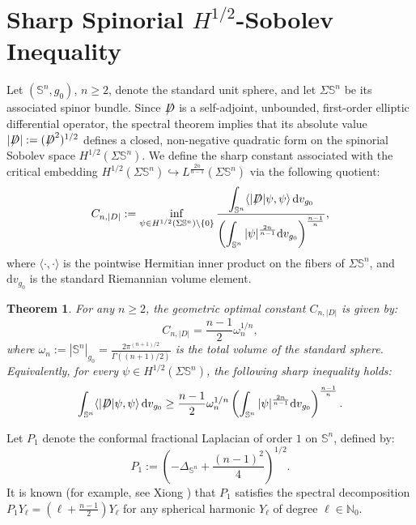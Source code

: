 \documentclass[a4paper, 12pt]{article}
\newtheorem{theorem}{Theorem}[section]
\def\slashiii#1{\setbox0=\hbox{$#1$}#1\hskip-\wd0\hbox to\wd0{\hss\sl/\/\hss}}
\begin{document}

\appendix
\makeatletter
\renewcommand{\@seccntformat}[1]{\ifcsname quad#1\endcsname\csname quad#1\endcsname\else\csname the#1\endcsname\quad\fi}
\renewcommand{\thesection}{Appendix \Alph{section}}
\makeatother
\renewcommand{\thetheorem}{\Alph{section}.\arabic{theorem}}
\newpage

\section{Sharp Spinorial $H^{1/2}$-Sobolev Inequality} 
Let $(\mathbb{S}^n, g_0)$, $n \ge 2$, denote the standard unit sphere, and let $\Sigma \mathbb{S}^n$ be its associated spinor bundle. Since $\slashiii{D}$ is a self-adjoint, unbounded, first-order elliptic differential operator, the spectral theorem implies that its absolute value $|\slashiii{D}| := (\slashiii{D}^2)^{1/2}$ defines a closed, non-negative quadratic form on the spinorial Sobolev space $H^{1/2}(\Sigma \mathbb{S}^n)$. We define the sharp constant associated with the critical embedding $H^{1/2}(\Sigma \mathbb{S}^n) \hookrightarrow L^{\frac{2n}{n-1}}(\Sigma \mathbb{S}^n)$ via the following quotient:
$$
C_{n,|D|} := \inf_{\psi \in H^{1/2}(\Sigma \mathbb{S}^n) \setminus \{0\}} \frac{\displaystyle \int_{\mathbb{S}^n} \langle |\slashiii{D}|\psi, \psi \rangle \, \text{d}v_{g_0}}{\displaystyle \left( \int_{\mathbb{S}^n} |\psi|^{\frac{2n}{n-1}} \text{d}v_{g_0} \right)^{\frac{n-1}{n}}},
$$
where $\langle \cdot, \cdot \rangle$ is the pointwise Hermitian inner product on the fibers of $\Sigma \mathbb{S}^n$, and $\text{d}v_{g_0}$ is the standard Riemannian volume element.
\begin{theorem}\label{Sharp-const}
	For any $n \ge 2$, the geometric optimal constant $C_{n,|D|}$ is given by:
	$$
	C_{n,|D|} = \frac{n-1}{2} \omega_n^{1/n},
	$$
	where $\omega_n := |\mathbb{S}^n|_{g_0} = \frac{2\pi^{(n+1)/2}}{\Gamma((n+1)/2)}$ is the total volume of the standard sphere. Equivalently, for every $\psi \in H^{1/2}(\Sigma \mathbb{S}^n)$, the following sharp inequality holds:
	$$
	\int_{\mathbb{S}^n} \langle |\slashiii{D}|\psi, \psi \rangle \, \text{d}v_{g_0} \ge \frac{n-1}{2} \omega_n^{1/n} \left( \int_{\mathbb{S}^n} |\psi|^{\frac{2n}{n-1}} \text{d}v_{g_0} \right)^{\frac{n-1}{n}}.
	$$
\end{theorem}
Let $P_1$ denote the conformal fractional Laplacian of order $1$ on $\mathbb{S}^n$, defined by:
$$
P_1 := \left( -\Delta_{\mathbb{S}^n} + \frac{(n-1)^2}{4} \right)^{1/2}.
$$
It is known (for example, see Xiong \cite{MR4059997}) that $P_1$ satisfies the spectral decomposition $P_1 Y_\ell = \left( \ell + \frac{n-1}{2} \right) Y_\ell$ for any spherical harmonic $Y_\ell$ of degree $\ell \in \mathbb{N}_0$.
\end{document}
